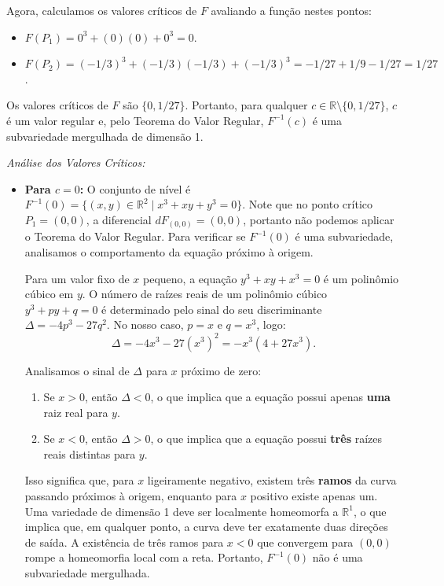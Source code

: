 {	Agora, calculamos os valores críticos de $F$ avaliando a função nestes pontos:
	\begin{itemize}
		\item $F(P_1) = 0^3 + (0)(0) + 0^3 = 0$.
		\item $F(P_2) = (-1/3)^3 + (-1/3)(-1/3) + (-1/3)^3 = -1/27 + 1/9 - 1/27 = 1/27$.
	\end{itemize}
	Os valores críticos de $F$ são $\{0, 1/27\}$. Portanto, para qualquer $c \in \mathbb{R} \setminus \{0, 1/27\}$, $c$ é um valor regular e, pelo Teorema do Valor Regular, $F^{-1}(c)$ é uma subvariedade mergulhada de dimensão 1.
	
	\textit{Análise dos Valores Críticos:}
	
	\begin{itemize}
		\item \textbf{Para $c = 0$:} O conjunto de nível é $F^{-1}(0) = \{ (x,y) \in \mathbb{R}^2 \mid x^3 + xy + y^3 = 0 \}$. 
		Note que no ponto crítico $P_1 = (0,0)$, a diferencial $dF_{(0,0)} = (0,0)$, portanto não podemos aplicar o Teorema do Valor Regular. Para verificar se $F^{-1}(0)$ é uma subvariedade, analisamos o comportamento da equação próximo à origem.
		
		Para um valor fixo de $x$ pequeno, a equação $y^3 + xy + x^3 = 0$ é um polinômio cúbico em $y$. O número de raízes reais de um polinômio cúbico $y^3 + py + q = 0$ é determinado pelo sinal do seu discriminante $\Delta = -4p^3 - 27q^2$. No nosso caso, $p = x$ e $q = x^3$, logo:
		\begin{equation*}
			\Delta = -4x^3 - 27(x^3)^2 = -x^3(4 + 27x^3).
		\end{equation*}
		
		Analisamos o sinal de $\Delta$ para $x$ próximo de zero:
		\begin{enumerate}
			\item Se $x > 0$, então $\Delta < 0$, o que implica que a equação possui apenas \textbf{uma} raiz real para $y$.
			\item Se $x < 0$, então $\Delta > 0$, o que implica que a equação possui \textbf{três} raízes reais distintas para $y$.
		\end{enumerate}
		
		Isso significa que, para $x$ ligeiramente negativo, existem três \textbf{ramos} da curva passando próximos à origem, enquanto para $x$ positivo existe apenas um. Uma variedade de dimensão 1 deve ser localmente homeomorfa a $\mathbb{R}^1$, o que implica que, em qualquer ponto, a curva deve ter exatamente duas direções de saída. A existência de três ramos para $x < 0$ que convergem para $(0,0)$ rompe a homeomorfia local com a reta. Portanto, $F^{-1}(0)$ não é uma subvariedade mergulhada.
		

\end{itemize}}
